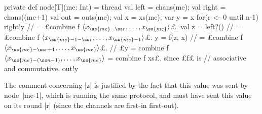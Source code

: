 \begin{answerI}
\begin{scala}
  private def node[T](me: Int) = thread{
    val left = chans(me); val right = chans((me+1)%
    val out = outs(me); val x = xs(me); var y = x
    for(r <- 0 until n-1){
      right!y         // = £combine f $\seq{x_{\ss{me}-\ss r}, \ldots, x_{\ss{me}}}$£.
      val z = left?() // = £combine f $\seq{x_{\ss{me}-1-\ss r}, \ldots, x_{\ss{me}-1}}$£.
      y = f(z, x)     // = £combine f $\seq{x_{\ss{me}-\ss r+1}, \ldots, x_{\ss{me}}}$£.
    }
    // £y = combine f $\seq{x_{\ss{me}-(\ss n-1)}, \ldots, x_{\ss{me}}}$ = combine f xs£, since £f£ is
    // associative and commutative.
    out!y
  }  
\end{scala}
%

%
The comment concerning |z| is justified by the fact that this value was sent
by node~|me-1|, which is running the same protocol, and must have sent this
value on its round |r| (since the channels are first-in first-out). 
\end{answerI}
